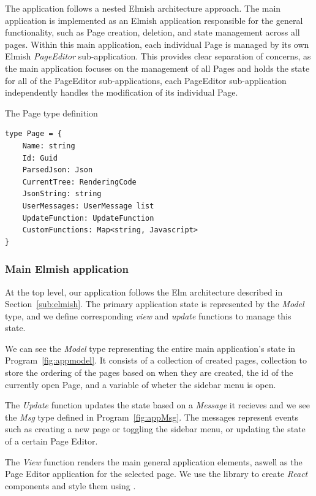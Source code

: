 The application follows a nested Elmish architecture approach.
The main application is implemented as an Elmish application responsible for the general functionality, such as Page creation, deletion, and state management across all pages.
Within this main application, each individual Page is managed by its own Elmish \emph{PageEditor} sub-application.
This provides clear separation of concerns, as the main application focuses on the management of all Pages and holds the state for all of the PageEditor sub-applications,
each PageEditor sub-application independently handles the modification of its individual Page.

\begin{listing}[H]
	\caption{The Page type definition}
	\label{prog:page}
	\begin{lstlisting}
type Page = {
    Name: string
    Id: Guid
    ParsedJson: Json
    CurrentTree: RenderingCode
    JsonString: string
    UserMessages: UserMessage list
    UpdateFunction: UpdateFunction
    CustomFunctions: Map<string, Javascript>
}
  \end{lstlisting}
\end{listing}

\medskip
\subsubsection{Main Elmish application}
At the top level, our application follows the Elm architecture described in Section~\ref{sub:elmish}.
The primary application state is represented by the \emph{Model} type, and we define corresponding \emph{view} and \emph{update} functions to manage this state.

We can see the \emph{Model} type representing the entire main application's state in Program~\ref{fig:appmodel}.
It consists of a collection of created pages, collection to store the ordering of the pages based on when they are created, the id of the currently open Page, and a variable of wheter the sidebar menu is open.

The \emph{Update} function updates the state based on a \emph{Message} it recieves and we see the \emph{Msg} type defined in Program~\ref{fig:appMsg}.
The messages represent events such as creating a new page or toggling the sidebar menu, or updating the state of a certain Page Editor.

The \emph{View} function renders the main general application elements, aswell as the Page Editor application for the selected page.
We use the \citet{feliz} library to create \emph{React} components and style them using \citet{tailwind}.

